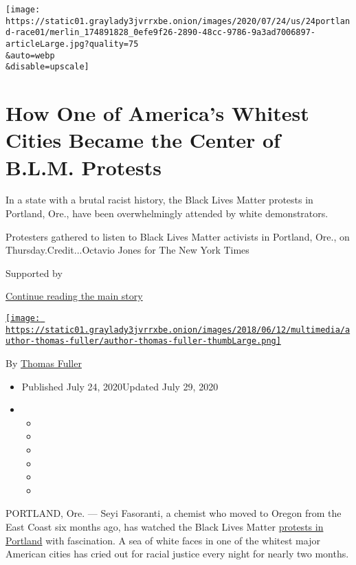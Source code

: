 \texttt{[image: https://static01.graylady3jvrrxbe.onion/images/2020/07/24/us/24portland-race01/merlin\_174891828\_0efe9f26-2890-48cc-9786-9a3ad7006897-articleLarge.jpg?quality=75\\\&auto=webp\\\&disable=upscale]}

\hypertarget{how-one-of-americas-whitest-cities-became-the-center-of-blm-protests}{%
\section{How One of America's Whitest Cities Became the Center of B.L.M.
Protests}\label{how-one-of-americas-whitest-cities-became-the-center-of-blm-protests}}

In a state with a brutal racist history, the Black Lives Matter protests
in Portland, Ore., have been overwhelmingly attended by white
demonstrators.

Protesters gathered to listen to Black Lives Matter activists in
Portland, Ore., on Thursday.Credit...Octavio Jones for The New York
Times

Supported by

\protect\hyperlink{after-sponsor}{Continue reading the main story}

\href{https://www.nytimes3xbfgragh.onion/by/thomas-fuller}{\texttt{[image: https://static01.graylady3jvrrxbe.onion/images/2018/06/12/multimedia/author-thomas-fuller/author-thomas-fuller-thumbLarge.png]}}

By \href{https://www.nytimes3xbfgragh.onion/by/thomas-fuller}{Thomas
Fuller}

\begin{itemize}
\item
  Published July 24, 2020Updated July 29, 2020
\item
  \begin{itemize}
  \item
  \item
  \item
  \item
  \item
  \item
  \end{itemize}
\end{itemize}

PORTLAND, Ore. --- Seyi Fasoranti, a chemist who moved to Oregon from
the East Coast six months ago, has watched the Black Lives Matter
\href{https://www.nytimes3xbfgragh.onion/2020/07/29/us/protests-portland-federal-withdrawal.html}{protests
in Portland} with fascination. A sea of white faces in one of the
whitest major American cities has cried out for racial justice every
night for nearly two months.

